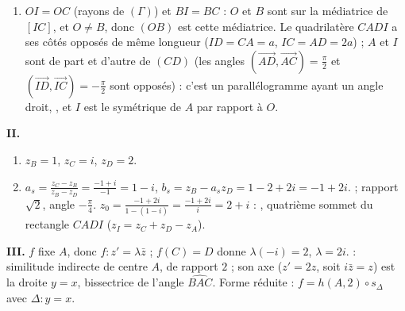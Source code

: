 \begin{corrige}
\begin{sol}
\begin{description}
\begin{enumerate}
                  Par Pythagore, $ID^2 + IC^2 = CD^2 = AD^2 + AC^2 = 5a^2$ ; avec (\ref{eq:rapport}), $5ID^2 = 5a^2$, donc $ID = a$.
                  Enfin $s(I) = I$ et $s(D) = B$ donnent $IB = \sqrt2\, ID = a\sqrt2 = BC$.
            \item $OI = OC$ (rayons de $(\Gamma)$) et $BI = BC$ : $O$ et $B$ sont sur la médiatrice de $[IC]$, et $O \neq B$, donc $(OB)$ est cette médiatrice.
                  Le quadrilatère $CADI$ a ses côtés opposés de même longueur ($ID = CA = a$, $IC = AD = 2a$) ; $A$ et $I$ sont de part et d'autre de $(CD)$
                  (les angles $(\overrightarrow{AD},\overrightarrow{AC}) = \frac{\pi}{2}$ et $(\overrightarrow{ID},\overrightarrow{IC}) = -\frac{\pi}{2}$ sont opposés) :
                  c'est un parallélogramme ayant un angle droit, , et $I$ est le symétrique de $A$ par rapport à $O$.
      \end{enumerate}
      \textbf{II.}
      \begin{enumerate}
            \item $z_B = 1$, $z_C = i$, $z_D = 2$.
            \item $a_s = \frac{z_C - z_B}{z_B - z_D} = \frac{-1 + i}{-1} = 1 - i$, $b_s = z_B - a_s z_D = 1 - 2 + 2i = -1 + 2i$.
                   ; rapport $\sqrt2$, angle $-\frac{\pi}{4}$.
                  $z_0 = \frac{-1 + 2i}{1 - (1 - i)} = \frac{-1 + 2i}{i} = 2 + i$ : , quatrième sommet du rectangle $CADI$ ($z_I = z_C + z_D - z_A$).
      \end{enumerate}
      \textbf{III.} $f$ fixe $A$, donc $f : z' = \lambda\bar{z}$ ; $f(C) = D$ donne $\lambda(-i) = 2$, $\lambda = 2i$.
       : similitude indirecte de centre $A$, de rapport $2$ ;
      son axe ($z' = 2z$, soit $i\bar{z} = z$) est la droite $y = x$, bissectrice de l'angle $\widehat{BAC}$.
      Forme réduite : $f = h(A,2) \circ s_{\Delta}$ avec $\Delta : y = x$.
\end{description}
\end{sol}
\end{corrige}
